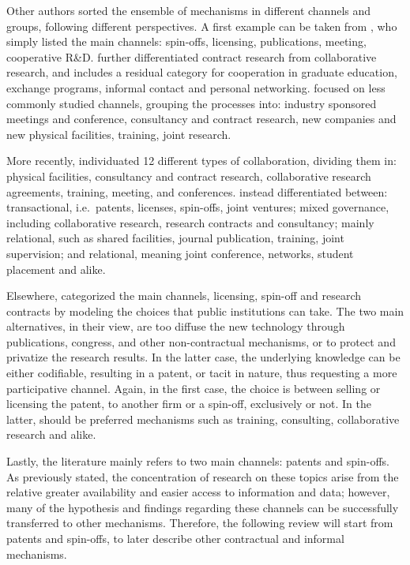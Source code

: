 Other authors sorted the ensemble of mechanisms in different channels and groups, following different perspectives. A first example can be taken from 	\citet{Rogers2001}, who simply listed the main channels: spin-offs, licensing, publications, meeting, cooperative R\&D. \citet{Debackere2005} further differentiated contract research from collaborative research, and includes a residual category for cooperation in graduate education, exchange programs, informal contact and personal networking. \citet{DEste2007} focused on less commonly studied channels, grouping the processes into: industry sponsored meetings and conference, consultancy and contract research, new companies and new physical facilities, training, joint research. 

More recently, \citet{Muscio2013} individuated 12 different types of collaboration, dividing them in: physical facilities, consultancy and contract research, collaborative research agreements, training, meeting, and conferences. \citet{Alexander2013} instead differentiated between: transactional, i.e.\ patents, licenses, spin-offs, joint ventures; mixed governance, including collaborative research, research contracts and consultancy; mainly relational, such as shared facilities, journal publication, training, joint supervision; and relational, meaning joint conference, networks, student placement and alike.

Elsewhere, \citet{Balderi2010} categorized the main channels, licensing, spin-off and research contracts by modeling the choices that public institutions can take. The two main alternatives, in their view, are too diffuse the new technology through publications, congress, and other non-contractual mechanisms, or to protect and privatize the research results. In the latter case, the underlying knowledge can be either codifiable, resulting in a patent, or tacit in nature, thus requesting a more participative channel. Again, in the first case, the choice is between selling or licensing the patent, to another firm or a spin-off, exclusively or not. In the latter, should be preferred mechanisms such as training, consulting, collaborative research and alike. 

Lastly, the literature mainly refers to two main channels: patents and spin-offs. As previously stated, the concentration of research on these topics arise from the relative greater availability and easier access to information and data; however, many of the hypothesis and findings regarding these channels can be successfully transferred to other mechanisms. Therefore, the following review will start from patents and spin-offs, to later describe other contractual and informal mechanisms. 

